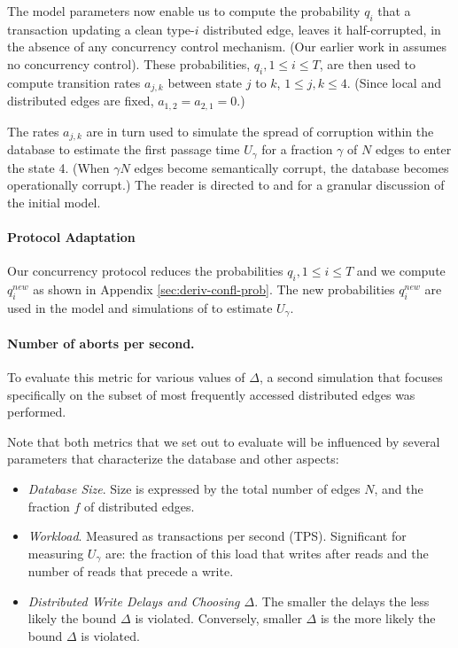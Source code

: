 The model parameters now enable us to compute the probability $q_i$ that a transaction updating a clean type-$i$ distributed edge, leaves it half-corrupted, in the absence of any concurrency control mechanism. (Our earlier work in \cite{Ezhilchelvan2018} assumes no concurrency control). These probabilities, $q_i, 1 \leq i \leq T$, are then used to compute transition rates $a_{j,k}$ between state $j$ to $k$, $1 \leq j,k \leq 4$. (Since local and distributed edges are fixed, $a_{1,2} = a_{2,1} = 0$.)

The rates $a_{j,k}$ are in turn used to simulate the spread of corruption within the database to estimate the first passage time $U_{\gamma}$  for a fraction ${\gamma}$ of $N$ edges to enter the state 4. (When $\gamma N$ edges become semantically corrupt, the database becomes operationally corrupt.)  The reader is directed to \cite{Ezhilchelvan2018} and \cite{Webber2019} for a granular discussion of the initial model.

\paragraph{\tDelta Protocol Adaptation}
Our concurrency protocol reduces the probabilities $q_i, 1 \leq i \leq T$ and we compute $q^{new}_i$ as shown in Appendix \ref{sec:deriv-confl-prob}.
The new probabilities $q^{new}_i$ are used in the model and simulations of \cite{Ezhilchelvan2018} to estimate $U_{\gamma}$.

\paragraph{Number of aborts per second.} To evaluate this metric for various values of $\Delta$, a second simulation that focuses specifically on the subset of most frequently accessed distributed edges was performed.

Note that both metrics that we set out to evaluate will be influenced by several parameters that characterize the database and other aspects:
\begin{itemize}
\item \emph{Database Size}. Size is expressed by the total number of edges $N$, and the fraction $f$ of distributed edges.
\item \emph{Workload}. Measured as transactions per second (TPS). Significant for measuring $U_{\gamma}$ are: the fraction of this load that writes after reads and the number of reads that precede a write.
\item \emph{Distributed Write Delays and Choosing $\Delta$}. The smaller the delays the less likely the bound $\Delta$ is violated. Conversely, smaller $\Delta$ is the more likely the bound $\Delta$ is violated.
\end{itemize}
